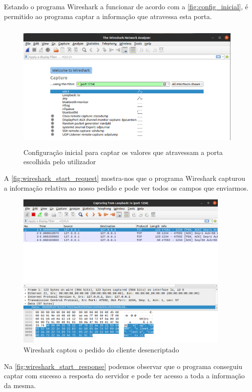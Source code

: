 \documentclass{report}
\begin{document}
Estando o programa Wireshark a funcionar de acordo com a \autoref{fig:config_inicial}, é permitido ao programa captar a informação que atravessa esta porta. 

\begin{figure}[!h]
\center 
\includegraphics[height=180pt]{img/non_encripted/config_inicial.png}
\caption{Configuração inicial para captar os valores que atravessam a porta escolhida pelo utilizador}
\label{fig:config_inicial}
\end{figure}

A \autoref{fig:wireshark_start_request} mostra-nos que o programa Wireshark capturou a informação relativa ao nosso pedido e pode ver todos os campos que enviarmos.

\begin{figure}[!h]
\center 
\includegraphics[height=220pt]{img/non_encripted/wireshark_start_request.png}
\caption{Wireshark captou o pedido do cliente desencriptado}
\label{fig:wireshark_start_request}
\end{figure}

Na \autoref{fig:wireshark_start_response} podemos observar que o programa conseguiu captar com sucesso a resposta do servidor e pode ter acesso a toda a informação da mesma.
\end{document}
